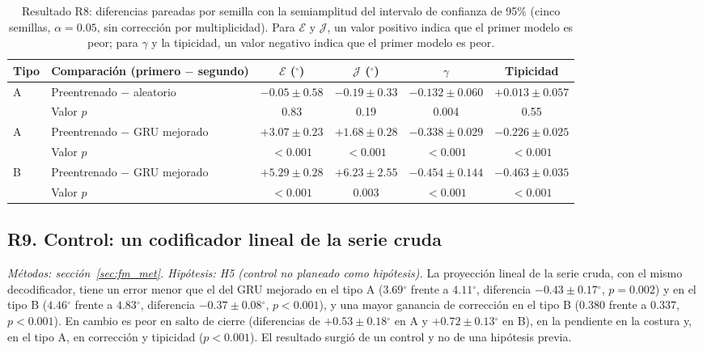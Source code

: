 \documentclass[11pt,a4paper]{article}
\newcommand{\gr}{$^{\circ}$}
\begin{document}
\begin{table}[h]
\centering\small
\setlength{\tabcolsep}{3pt}
\begin{tabular}{llcccc}
\toprule
Tipo & Comparación (primero $-$ segundo) & $\mathcal E$ (\gr) & $\mathcal J$ (\gr) & $\gamma$ & Tipicidad \\
\midrule
A & Preentrenado $-$ aleatorio & $-0.05\pm0.58$ & $-0.19\pm0.33$ & $-0.132\pm0.060$ & $+0.013\pm0.057$ \\
 & Valor $p$ & 0.83 & 0.19 & 0.004 & 0.55 \\
A & Preentrenado $-$ GRU mejorado & $+3.07\pm0.23$ & $+1.68\pm0.28$ & $-0.338\pm0.029$ & $-0.226\pm0.025$ \\
 & Valor $p$ & $<0.001$ & $<0.001$ & $<0.001$ & $<0.001$ \\
B & Preentrenado $-$ GRU mejorado & $+5.29\pm0.28$ & $+6.23\pm2.55$ & $-0.454\pm0.144$ & $-0.463\pm0.035$ \\
 & Valor $p$ & $<0.001$ & 0.003 & $<0.001$ & $<0.001$ \\
\bottomrule
\end{tabular}
\caption{Resultado R8: diferencias pareadas por semilla con la semiamplitud del intervalo de confianza de 95\% (cinco semillas, $\alpha=0.05$, sin corrección por multiplicidad). Para $\mathcal E$ y $\mathcal J$, un valor positivo indica que el primer modelo es peor; para $\gamma$ y la tipicidad, un valor negativo indica que el primer modelo es peor.}
\label{tab:fmd}
\end{table}

\subsection{R9. Control: un codificador lineal de la serie cruda}
\label{sec:r9}

\textit{Métodos: sección~\ref{sec:fm_met}. Hipótesis: H5 (control no planeado como hipótesis).} La proyección lineal de la serie cruda, con el mismo decodificador, tiene un error menor que el del GRU mejorado en el tipo A ($3.69$\gr{} frente a $4.11$\gr, diferencia $-0.43\pm0.17$\gr, $p=0.002$) y en el tipo B ($4.46$\gr{} frente a $4.83$\gr, diferencia $-0.37\pm0.08$\gr, $p<0.001$), y una mayor ganancia de corrección en el tipo B ($0.380$ frente a $0.337$, $p<0.001$). En cambio es peor en salto de cierre (diferencias de $+0.53\pm0.18$\gr{} en A y $+0.72\pm0.13$\gr{} en B), en la pendiente en la costura y, en el tipo A, en corrección y tipicidad ($p<0.001$). El resultado surgió de un control y no de una hipótesis previa.
\end{document}
